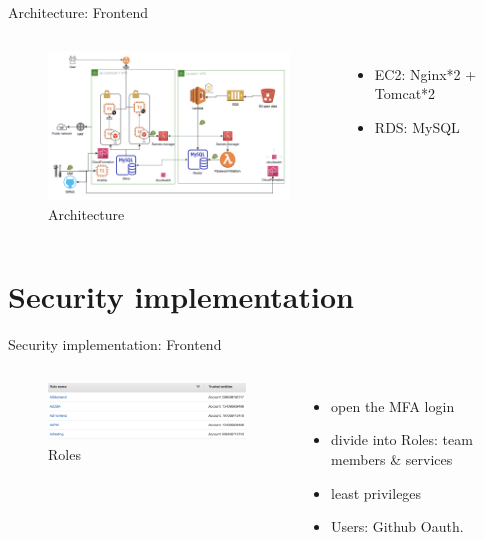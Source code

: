 \documentclass[aspectratio=169]{beamer}
\begin{document}
\begin{frame}[fragile]{Architecture: Frontend}

  \begin{columns}
      \begin{figure}[htbp]
        \centerline{\includegraphics[width=220pt]{images/arch.png}}
        \caption{Architecture}
       \end{figure}

      \begin{itemize}
        \item EC2: Nginx*2 + Tomcat*2
        \pause
        \item RDS: MySQL
      \end{itemize}
  \end{columns}

\end{frame}

\section{Security implementation}

\begin{frame}[fragile]{Security implementation: Frontend}

  \begin{columns}
      \begin{figure}[htbp]
        \centerline{\includegraphics[width=220pt]{images/roles.png}}
        \caption{Roles}
      \end{figure}

      \begin{itemize}
        \item open the MFA login
        \item divide into Roles: team members \& services
        \item least privileges
        \pause
        \item Users: Github Oauth.
        
      \end{itemize}
  \end{columns}

\end{frame}
\end{document}
